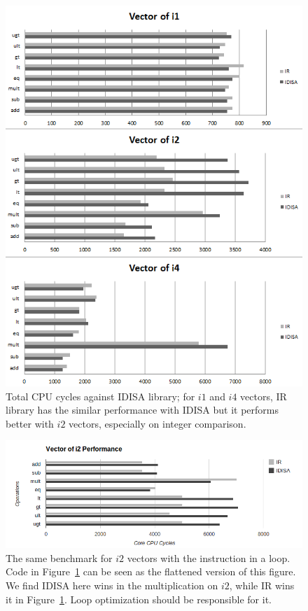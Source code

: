 \begin{figure}[ht!]
\centering
\includegraphics[width=140mm]{draw/cpu_cycles_vector.png}
\caption[Total CPU cycles against IDISA library]{Total CPU cycles against IDISA library; for $i1$ and $i4$ vectors, IR library has the similar performance with IDISA but it performs better with $i2$ vectors, especially on integer comparison.}
\label{figure:cpu_cycles_vector}
\end{figure}

\begin{figure}[ht!]
\centering
\includegraphics[width=140mm]{draw/loop_vector_i2.png}
\caption[Vector of $i2$ tested in a loop]{The same benchmark for $i2$ vectors with the instruction in a loop. Code in Figure~\ref{figure:cpu_cycles_vector} can be seen as the flattened version of this figure. We find IDISA here wins in the multiplication on $i2$, while IR wins it in Figure~\ref{figure:cpu_cycles_vector}. Loop optimization should be responsible for it.}
\label{figure:loop_vector_i2}
\end{figure}

